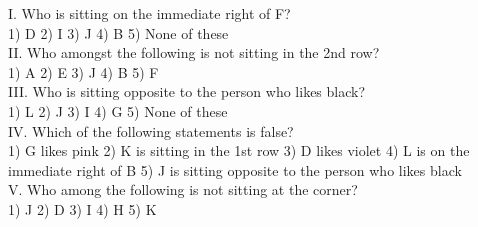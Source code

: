 \documentclass[
]{article}
\begin{document}
I. Who is sitting on the immediate right of F?\\
1) D \hspace{2mm}2) I \hspace{2mm}3) J \hspace{2mm}4) B \hspace{2mm}5) None of these\\

II. Who amongst the following is not sitting in the 2nd row?\\
1) A \hspace{2mm}2) E \hspace{2mm}3) J \hspace{2mm}4) B \hspace{2mm}5) F\\

III. Who is sitting opposite to the person who likes black?\\
1) L \hspace{2mm}2) J \hspace{2mm}3) I \hspace{2mm}4) G \hspace{2mm}5) None of these\\

IV. Which of the following statements is false?\\
1) G likes pink \hspace{2mm}2) K is sitting in the 1st row
\hspace{2mm}3) D likes violet \hspace{2mm}4) L is on the immediate right of B
\hspace{2mm}5) J is sitting opposite to the person who likes black\\

V. Who among the following is not sitting at the corner?\\
1) J \hspace{2mm}2) D \hspace{2mm}3) I \hspace{2mm}4) H \hspace{2mm}5) K\\
\end{document}
